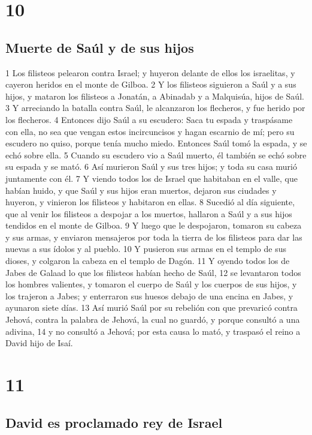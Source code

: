\chapter{10}

\section*{Muerte de Saúl y de sus hijos }


1 Los filisteos pelearon contra Israel; y huyeron delante de ellos los israelitas, y cayeron heridos en el monte de Gilboa.
2 Y los filisteos siguieron a Saúl y a sus hijos, y mataron los filisteos a Jonatán, a Abinadab y a Malquisúa, hijos de Saúl.
3 Y arreciando la batalla contra Saúl, le alcanzaron los flecheros, y fue herido por los flecheros.
4 Entonces dijo Saúl a su escudero: Saca tu espada y traspásame con ella, no sea que vengan estos incircuncisos y hagan escarnio de mí; pero su escudero no quiso, porque tenía mucho miedo. Entonces Saúl tomó la espada, y se echó sobre ella.
5 Cuando su escudero vio a Saúl muerto, él también se echó sobre su espada y se mató.
6 Así murieron Saúl y sus tres hijos; y toda su casa murió juntamente con él.
7 Y viendo todos los de Israel que habitaban en el valle, que habían huido, y que Saúl y sus hijos eran muertos, dejaron sus ciudades y huyeron, y vinieron los filisteos y habitaron en ellas.
8 Sucedió al día siguiente, que al venir los filisteos a despojar a los muertos, hallaron a Saúl y a sus hijos tendidos en el monte de Gilboa.
9 Y luego que le despojaron, tomaron su cabeza y sus armas, y enviaron mensajeros por toda la tierra de los filisteos para dar las nuevas a sus ídolos y al pueblo.
10 Y pusieron sus armas en el templo de sus dioses, y colgaron la cabeza en el templo de Dagón.
11 Y oyendo todos los de Jabes de Galaad lo que los filisteos habían hecho de Saúl,
12 se levantaron todos los hombres valientes, y tomaron el cuerpo de Saúl y los cuerpos de sus hijos, y los trajeron a Jabes; y enterraron sus huesos debajo de una encina en Jabes, y ayunaron siete días.
13 Así murió Saúl por su rebelión con que prevaricó contra Jehová, contra la palabra de Jehová, la cual no guardó, y porque consultó a una adivina, 
14 y no consultó a Jehová; por esta causa lo mató, y traspasó el reino a David hijo de Isaí.

\chapter{11}

\section*{David es proclamado rey de Israel }


